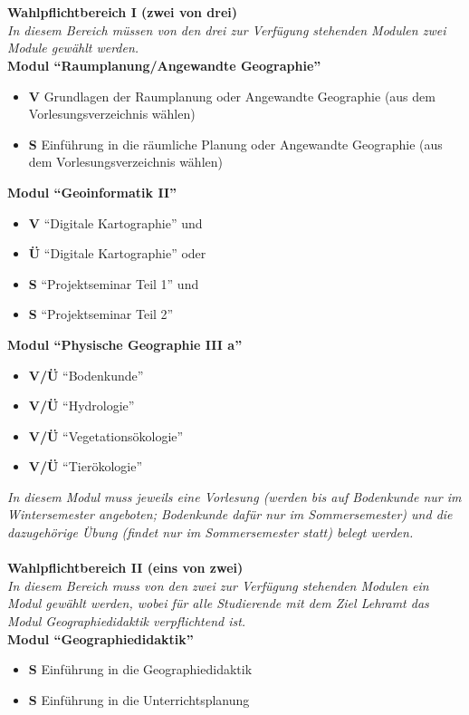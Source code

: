 \\\\
\textbf{Wahlpflichtbereich I (zwei von drei)}\\
\emph{In diesem Bereich müssen von den drei zur Verfügung stehenden Modulen zwei Module gewählt werden.}\\

\textbf{Modul "`Raumplanung/Angewandte Geographie"'}
	\begin{itemize}
		\item \textbf{V} Grundlagen der Raumplanung oder Angewandte Geographie (aus dem Vorlesungsverzeichnis wählen)
		\item \textbf{S} Einführung in die räumliche Planung oder Angewandte Geographie (aus dem Vorlesungsverzeichnis wählen)
	\end{itemize}


\textbf{Modul "`Geoinformatik II"'}
\begin{itemize}
	\item \textbf{V} "`Digitale Kartographie"' und
	\item \textbf{Ü} "`Digitale Kartographie"' oder
	\item \textbf{S} "`Projektseminar Teil 1"' und
	\item \textbf{S} "`Projektseminar Teil 2"'
\end{itemize}

\textbf{Modul "`Physische Geographie III a"'}
	\begin{itemize}
		\item \textbf{V/Ü} "`Bodenkunde"'
		\item \textbf{V/Ü} "`Hydrologie"'
		\item \textbf{V/Ü} "`Vegetationsökologie"'
		\item \textbf{V/Ü} "`Tierökologie"'
	\end{itemize}
\emph{In diesem Modul muss jeweils eine Vorlesung (werden bis auf Bodenkunde nur im Wintersemester angeboten; Bodenkunde dafür nur im Sommersemester) und die dazugehörige Übung (findet nur im Sommersemester statt) belegt werden.}\\\\
\textbf{Wahlpflichtbereich II (eins von zwei)}\\
\emph{In diesem Bereich muss von den zwei zur Verfügung stehenden Modulen ein Modul gewählt werden, wobei für alle Studierende mit dem Ziel Lehramt das Modul Geographiedidaktik verpflichtend ist.}\\

\textbf{Modul "`Geographiedidaktik"'}
	\begin{itemize}
		\item \textbf{S} Einführung in die Geographiedidaktik
		\item \textbf{S} Einführung in die Unterrichtsplanung
	\end{itemize}

